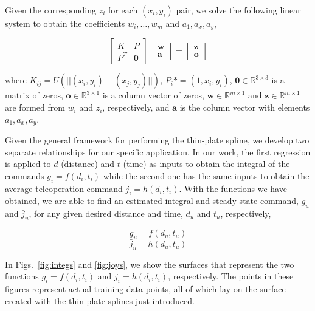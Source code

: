 \documentclass[letterpaper, 10 pt, conference]{ieeeconf}  %
\newcommand\NB[1]{$\spadesuit$\footnote{NB: #1}}
\begin{document}
Given the corresponding $z_i$ for each $(x_i,y_i)$ pair, we solve the following linear system to obtain the coefficients $w_i,\ldots,w_m$ and $a_1,a_x,a_y$,

\begin{equation}
    \begin{bmatrix}
    K&P\\
    P^T& \bm{0}
    \end{bmatrix}
    \begin{bmatrix}
    \bm{w}\\
    \bm{a}
    \end{bmatrix} = 
    \begin{bmatrix}
    \bm{z}\\
    \bm{o}
    \end{bmatrix}
\end{equation}

where $K_{ij} = U(||(x_i,y_i)-(x_j,y_j)||)$, $P_i* = (1,x_i,y_i)$, $\bm{0}  \in \mathbb{R}^{3\times3}$ is a matrix of zeros, $\bm{o} \in \mathbb{R}^{3\times1}$ is a column vector of zeros, $\bm{w} \in \mathbb{R}^{m\times1}$ and $\bm{z} \in \mathbb{R}^{m\times1}$ are formed from $w_i$ and $z_i$, respectively, and $\bm{a}$ is the column vector with elements $a_1,a_x,a_y$.

Given the general framework for performing the thin-plate spline, we develop two separate relationships for our specific application. In our work, the first regression is applied to $d$ (distance) and $t$ (time) as inputs to obtain the integral of the commands $g_i = f(d_i,t_i)$ while the second one has the same inputs to obtain the average teleoperation command $\bar{j}_i = h(d_i,t_i)$. With the functions we have obtained, we are able to find an estimated integral and steady-state command, $g_u$ and $\bar{j}_u$, for any given desired distance and time, $d_u$ and $t_u$, respectively,

\begin{equation} \label{eq:integralfit}
g_u = f(d_u,t_u)
\end{equation}
\begin{equation} \label{eq:ssvelfit}
\bar{j}_u = h(d_u,t_u)
\end{equation}

In Figs.~\ref{fig:integs} and \ref{fig:joys}, we show the surfaces that represent the two functions $g_i = f(d_i,t_i)$ and $\bar{j}_i = h(d_i,t_i)$, respectively. The points in these figures represent actual training data points, all of which lay on the surface created with the thin-plate splines just introduced.
\end{document}
